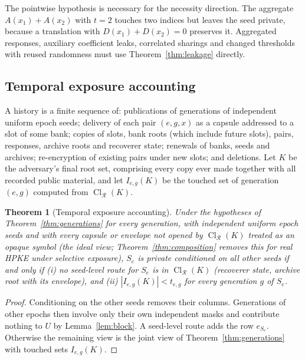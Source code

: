 \documentclass[pdflatex,sn-mathphys-num]{sn-jnl}
\theoremstyle{plain}
\newtheorem{theorem}{Theorem}
\theoremstyle{definition}
\newcommand{\Cl}{\operatorname{Cl}}
\begin{document}
The pointwise hypothesis is necessary for the necessity direction. The aggregate $A(x_1)+A(x_2)$ with $t=2$ touches two indices but leaves the seed private, because a translation with $D(x_1)+D(x_2)=0$ preserves it. Aggregated responses, auxiliary coefficient leaks, correlated sharings and changed thresholds with reused randomness must use Theorem~\ref{thm:leakage} directly.

\subsection{Temporal exposure accounting}
A history is a finite sequence of: publications of generations of independent uniform epoch seeds; delivery of each pair $(e,g,x)$ as a capsule addressed to a slot of some bank; copies of slots, bank roots (which include future slots), pairs, responses, archive roots and recoverer state; renewals of banks, seeds and archives; re-encryption of existing pairs under new slots; and deletions. Let $K$ be the adversary's final root set, comprising every copy ever made together with all recorded public material, and let $I_{e,g}(K)$ be the touched set of generation $(e,g)$ computed from $\Cl_{\mathcal R}(K)$.

\begin{theorem}[Temporal exposure accounting]\label{thm:temporal}
Under the hypotheses of Theorem~\ref{thm:generations} for every generation, with independent uniform epoch seeds and with every capsule or envelope not opened by $\Cl_{\mathcal R}(K)$ treated as an opaque symbol (the ideal view; Theorem~\ref{thm:composition} removes this for real HPKE under selective exposure), $S_e$ is private conditioned on all other seeds if and only if (i) no seed-level route for $S_e$ is in $\Cl_{\mathcal R}(K)$ (recoverer state, archive root with its envelope), and (ii) $|I_{e,g}(K)|<t_{e,g}$ for every generation $g$ of $S_e$.
\end{theorem}
\begin{proof}
Conditioning on the other seeds removes their columns. Generations of other epochs then involve only their own independent masks and contribute nothing to $U$ by Lemma~\ref{lem:block}. A seed-level route adds the row $e_{S_e}$. Otherwise the remaining view is the joint view of Theorem~\ref{thm:generations} with touched sets $I_{e,g}(K)$.
\end{proof}
\end{document}
